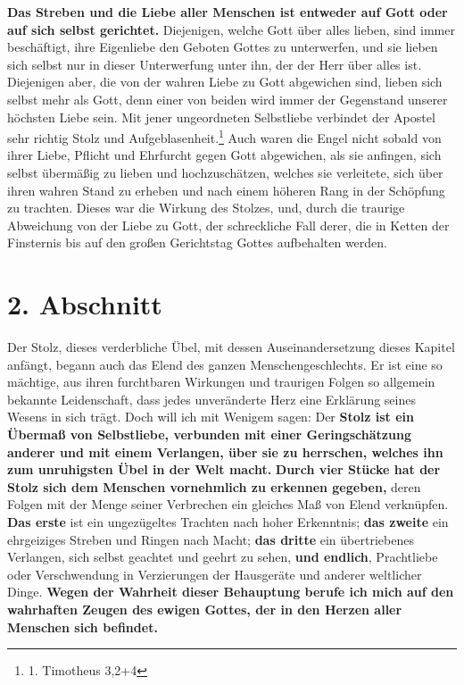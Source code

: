 \textbf{Das Streben und die Liebe aller Menschen ist
entweder auf Gott oder auf sich
selbst gerichtet.} Diejenigen, welche Gott über alles lieben, sind immer
beschäftigt, ihre Eigenliebe den Geboten Gottes zu unterwerfen, und sie lieben
sich selbst nur in dieser Unterwerfung unter ihn, der der Herr über alles ist.
Diejenigen aber, die von der wahren Liebe zu Gott abgewichen sind, lieben sich
selbst mehr als Gott, denn einer von beiden wird immer der Gegenstand unserer
höchsten Liebe sein. Mit jener ungeordneten Selbstliebe verbindet der Apostel
sehr richtig Stolz und Aufgeblasenheit.\footnote{1.
Timotheus 3,2+4}
Auch waren die
Engel nicht sobald von ihrer Liebe,
Pflicht und Ehrfurcht gegen Gott abgewichen,
als sie anfingen, sich selbst übermäßig zu lieben und hochzuschätzen, welches
sie verleitete, sich über ihren wahren Stand zu erheben und nach einem höheren
Rang in der Schöpfung zu trachten. Dieses war die Wirkung
des Stolzes, und,
durch die traurige Abweichung von der Liebe zu Gott, der schreckliche Fall
derer, die in Ketten der Finsternis bis auf den großen Gerichtstag
Gottes
aufbehalten werden.

\section{2. Abschnitt} \label{kap7_ab2}

Der Stolz, dieses verderbliche Übel, mit dessen Auseinandersetzung
dieses
Kapitel anfängt, begann auch das Elend des ganzen Menschengeschlechts. Er ist
eine so mächtige, aus ihren furchtbaren Wirkungen und traurigen Folgen so
allgemein bekannte Leidenschaft, dass jedes unveränderte Herz eine Erklärung
seines Wesens in sich trägt. Doch will ich mit Wenigem sagen: Der \textbf{Stolz
ist ein Übermaß von Selbstliebe, verbunden mit einer Geringschätzung
anderer und mit einem Verlangen, über sie zu
herrschen, welches ihn zum unruhigsten Übel in der
Welt macht.} \textbf{Durch vier Stücke hat der Stolz sich dem Menschen
vornehmlich zu
erkennen gegeben,} deren Folgen mit der Menge seiner Verbrechen ein gleiches Maß
von Elend verknüpfen. \textbf{Das erste} ist ein ungezügeltes Trachten nach
hoher
Erkenntnis; \textbf{das zweite} ein ehrgeiziges Streben und
Ringen nach Macht; \textbf{das dritte} ein übertriebenes Verlangen,
sich selbst geachtet und geehrt zu sehen,
\textbf{und endlich}, Prachtliebe oder Verschwendung in
Verzierungen der Hausgeräte und anderer weltlicher Dinge. \textbf{Wegen der
Wahrheit dieser Behauptung berufe ich mich auf den wahrhaften Zeugen des ewigen
Gottes, der in den Herzen aller Menschen
sich befindet.}

